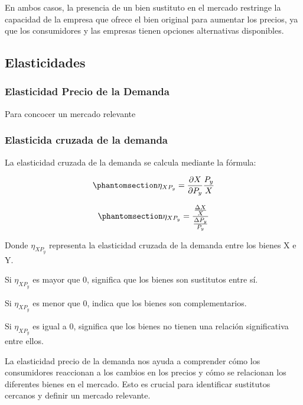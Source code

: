 \documentclass[
  doc,
  floatsintext,
  longtable,
  a4paper,
  nolmodern,
  notxfonts,
  notimes,
  12pt,
  colorlinks=true,linkcolor=blue,citecolor=blue,urlcolor=blue]{apa7}
\begin{document}
En ambos casos, la presencia de un bien sustituto en el mercado
restringe la capacidad de la empresa que ofrece el bien original para
aumentar los precios, ya que los consumidores y las empresas tienen
opciones alternativas disponibles.

\subsection{Elasticidades}\label{elasticidades}

\subsubsection{Elasticidad Precio de la
Demanda}\label{elasticidad-precio-de-la-demanda}

Para concocer un mercado relevante

\subsubsection{Elasticida cruzada de la
demanda}\label{elasticida-cruzada-de-la-demanda}

La elasticidad cruzada de la demanda se calcula mediante la fórmula:

\begin{equation}\protect\phantomsection\label{eq-1}{
\eta_{XP_{y}} = \frac{\partial X}{\partial P_{y}} \frac{P_{y}}{X}
}\end{equation}

\begin{equation}\protect\phantomsection\label{eq-2}{
\eta_{XP_{y}} = \frac{\frac{\Delta X}{X}}{\frac{\Delta P_{y}}{P_{y}}}
}\end{equation}

Donde \(\eta_{XP_y}\) representa la elasticidad cruzada de la demanda
entre los bienes X e Y.

Si \(\eta_{XP_y}\) es mayor que 0, significa que los bienes son
sustitutos entre sí.

Si \(\eta_{XP_y}\) es menor que 0, indica que los bienes son
complementarios.

Si \(\eta_{XP_y}\) es igual a 0, significa que los bienes no tienen una
relación significativa entre ellos.

La elasticidad precio de la demanda nos ayuda a comprender cómo los
consumidores reaccionan a los cambios en los precios y cómo se
relacionan los diferentes bienes en el mercado. Esto es crucial para
identificar sustitutos cercanos y definir un mercado relevante.
\end{document}
